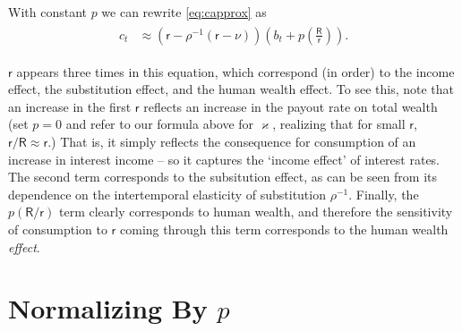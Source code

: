 \documentclass{scrartcl}
\begin{document}
With constant $\boldsymbol{\mathit{p}}$ we can rewrite \eqref{eq:capprox} as
\begin{equation}\begin{gathered}\begin{aligned}
        \boldsymbol{\mathit{c}}_{t} & \approx  \left(\mathsf{r}-\rho^{-1}(\mathsf{r}-\nu)\right)\left(\boldsymbol{\mathit{b}}_{t}+ \boldsymbol{\mathit{p}}\left(\frac{\mathsf{R}}{\mathsf{r}}\right)\right).
\end{aligned}\end{gathered}\end{equation}

$\mathsf{r}$ appears three times in this equation, which correspond (in
order) to the income effect, the substitution effect, and the human
wealth effect.
To see this, note that an increase in the first
$\mathsf{r}$ reflects an increase in the payout rate on total wealth (set
$\boldsymbol{\mathit{p}} = 0$ and refer to our formula above for $\varkappa$, realizing
that for small $\mathsf{r}$, $\mathsf{r}/\mathsf{R} \approx \mathsf{r}$.)
That is, it
simply reflects the consequence for consumption of an increase in interest
income -- so it captures the `income effect' of interest rates.
The second term
corresponds to the subsitution effect, as can be seen from its
dependence on the intertemporal elasticity of substitution
$\rho^{-1}$.
Finally, the $\boldsymbol{\mathit{p}}(\mathsf{R}/\mathsf{r})$ term clearly
corresponds to human wealth, and therefore the sensitivity of
consumption to $\mathsf{r}$ coming through this term corresponds to the
human wealth \textit{effect}.

\section{Normalizing By $\boldsymbol{\mathit{p}}$}
\end{document}
